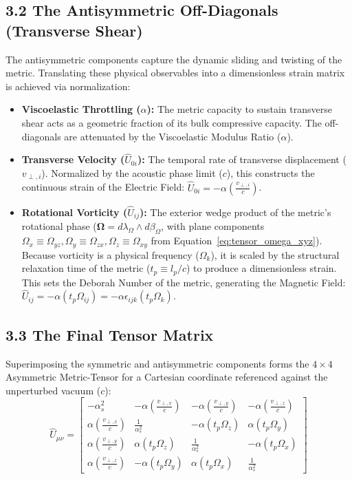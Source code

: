\subsection*{3.2 The Antisymmetric Off-Diagonals (Transverse Shear)}
The antisymmetric components capture the dynamic sliding and twisting of the metric. Translating these physical observables into a dimensionless strain matrix is achieved via normalization:
\begin{itemize}
    \item \textbf{Viscoelastic Throttling ($\alpha$):} The metric capacity to sustain transverse shear acts as a geometric fraction of its bulk compressive capacity. The off-diagonals are attenuated by the Viscoelastic Modulus Ratio ($\alpha$).
    \item \textbf{Transverse Velocity ($\hat{U}_{0i}$):} The temporal rate of transverse displacement ($v_{\perp, i}$). Normalized by the acoustic phase limit ($c$), this constructs the continuous strain of the Electric Field: $\hat{U}_{0i} = -\alpha \left( \frac{v_{\perp, i}}{c} \right)$. %
    \item \textbf{Rotational Vorticity ($\hat{U}_{ij}$):} The exterior wedge product of the metric's rotational phase ($\boldsymbol{\Omega} = d\lambda_\Omega \wedge d\beta_\Omega$, with plane components $\Omega_x \equiv \Omega_{yz}, \Omega_y \equiv \Omega_{zx}, \Omega_z \equiv \Omega_{xy}$ from Equation~\ref{eq:tensor_omega_xyz}). Because vorticity is a physical frequency ($\Omega_k$), it is scaled by the structural relaxation time of the metric ($t_p \equiv l_p/c$) to produce a dimensionless strain. This sets the Deborah Number of the metric, generating the Magnetic Field: $\hat{U}_{ij} = -\alpha (t_p \Omega_{ij}) = -\alpha \epsilon_{ijk}(t_p \Omega_k)$. %
\end{itemize}

\subsection*{3.3 The Final Tensor Matrix}
Superimposing the symmetric and antisymmetric components forms the $4 \times 4$ Asymmetric Metric-Tensor for a Cartesian coordinate referenced against the unperturbed vacuum ($c$): %
\begin{equation}
\hat{U}_{\mu\nu} = \begin{bmatrix}
-\alpha_s^2 & -\alpha \left( \frac{v_{\perp, x}}{c} \right) & -\alpha \left( \frac{v_{\perp, y}}{c} \right) & -\alpha \left( \frac{v_{\perp, z}}{c} \right) \\[8pt]
\alpha \left( \frac{v_{\perp, x}}{c} \right) & \frac{1}{\alpha_s^2} & -\alpha(t_p \Omega_z) & \alpha(t_p \Omega_y) \\[8pt]
\alpha \left( \frac{v_{\perp, y}}{c} \right) & \alpha(t_p \Omega_z) & \frac{1}{\alpha_s^2} & -\alpha(t_p \Omega_x) \\[8pt]
\alpha \left( \frac{v_{\perp, z}}{c} \right) & -\alpha(t_p \Omega_y) & \alpha(t_p \Omega_x) & \frac{1}{\alpha_s^2}
\end{bmatrix} \label{eq:unified_matrix}
\end{equation}

